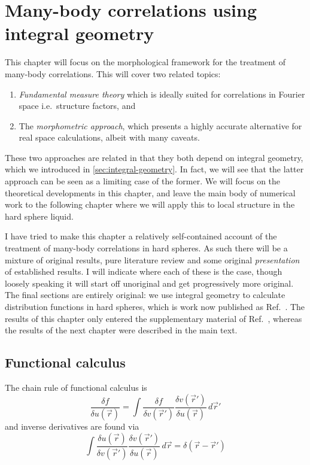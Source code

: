 \documentclass[12pt]{report}
\begin{document}
\chapter{Many-body correlations using integral geometry}

This chapter will focus on the morphological framework for the treatment of many-body correlations.
This will cover two related topics:
\begin{enumerate}
\item \emph{Fundamental measure theory} which is ideally suited for correlations in Fourier space i.e.\ structure factors, and
\item The \emph{morphometric approach}, which presents a highly accurate alternative for real space calculations, albeit with many caveats.
\end{enumerate}
These two approaches are related in that they both depend on integral geometry, which we introduced in \ref{sec:integral-geometry}.
In fact, we will see that the latter approach can be seen as a limiting case of the former.
We will focus on the theoretical developments in this chapter, and leave the main body of numerical work to the following chapter where we will apply this to local structure in the hard sphere liquid.

I have tried to make this chapter a relatively self-contained account of the treatment of many-body correlations in hard spheres.
As such there will be a mixture of original results, pure literature review and some original \emph{presentation} of established results.
I will indicate where each of these is the case, though loosely speaking it will start off unoriginal and get progressively more original.
The final sections are entirely original: we use integral geometry to calculate distribution functions in hard spheres, which is work now published as Ref.\ \cite{Robinson2019}.
The results of this chapter only entered the supplementary material of Ref.\ \cite{Robinson2019}, whereas the results of the next chapter were described in the main text.

\section{Functional calculus}

The chain rule of functional calculus is
\begin{equation*}
  \frac{\delta f}{\delta u(\vec{r})} =
  \int
  \frac{\delta f}{\delta v(\vec{r}')}
  \frac{\delta v(\vec{r}')}{\delta u(\vec{r})}
  \, d\vec{r}'
\end{equation*}
and inverse derivatives are found via
\begin{equation*}
  \int
  \frac{\delta u(\vec{r})}{\delta v(\vec{r}')}
  \frac{\delta v(\vec{r}')}{\delta u(\vec{r})}
  \, d\vec{r} =
  \delta(\vec{r} - \vec{r}')
\end{equation*}
\end{document}
